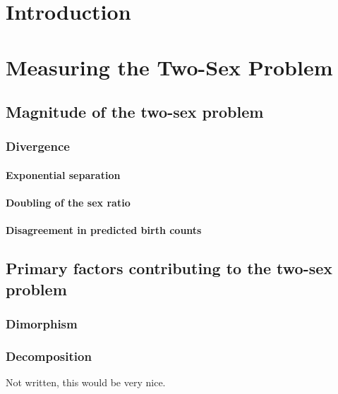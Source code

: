 \startthechapters 
 \chapter{Introduction}
 \label{chap:Intro}
 
 
\chapter{Measuring the Two-Sex Problem}

  \section{Magnitude of the two-sex problem}

    \subsection{Divergence}
      \subsubsection{Exponential separation}
        
      \subsubsection{Doubling of the sex ratio}
        
      \subsubsection{Disagreement in predicted birth counts}
        
      
  \section{Primary factors contributing to the two-sex problem}

    \subsection{Dimorphism}
      

    \subsection{Decomposition}
     Not written, this would be very nice.
